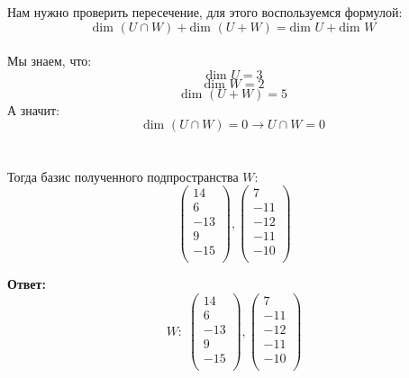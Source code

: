 \documentclass[a4paper,12pt]{article}
\begin{document}
Нам нужно проверить пересечение, для этого воспользуемся формулой:
\[
\text{dim }  (U \cap W) + \text{dim } (U + W) = \text{dim }U + \text{dim } W
\]
\\
Мы знаем, что:
\[
\text{dim }U = 3
\]
\[
\text{dim } W = 2
\]
\[
\text{dim } (U + W) = 5
\]
А значит:
\[
\text{dim }  (U \cap W) = 0 \rightarrow U \cap W = 0
\]
\\\\
Тогда базис полученного подпространства $W$:
\[
\begin{pmatrix}
14 \\
6 \\
-13 \\
9\\
-15\\
\end{pmatrix}
,
\begin{pmatrix}
7\\
-11\\
-12\\
-11\\
-10\\
\end{pmatrix}
\]
{\LARGE \begin{center}
\textbf{Ответ: }
\[
W : \;
\begin{pmatrix}
14 \\
6 \\
-13 \\
9\\
-15\\
\end{pmatrix}
,
\begin{pmatrix}
7\\
-11\\
-12\\
-11\\
-10\\
\end{pmatrix}
\] 
\end{center}}
\clearpage
\end{document}
